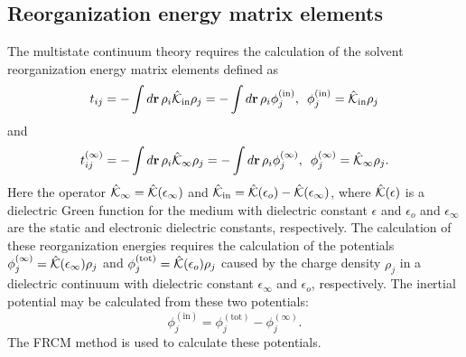 \documentclass[oneside,11pt,openany]{book}
\begin{document}
\subsection*{Reorganization energy matrix elements}
The multistate continuum theory requires the calculation
of the solvent
reorganization energy matrix elements defined as
\begin{equation}
t_{ij}=-\int d{\bf r}\, \rho_i \hat{\cal{K}}_{\mathrm{in}} \rho_j
= -\int d{\bf r}\, \rho_i \phi_j^{\mathrm{(in)}},\,\,\, \phi_j^{\mathrm{(in)}}=\hat{\cal{K}}_{\mathrm{in}} \rho_j
\end{equation}
and
\begin{equation}
t_{ij}^{(\infty)}=-\int d{\bf r}\, \rho_i \hat{\cal{K}}_{\infty} \rho_j
= -\int d{\bf r}\, \rho_i \phi_j^{(\infty)},\,\,\, \phi_j^{(\infty)}=\hat{\cal{K}}_{\infty} \rho_j.
\end{equation}
Here the operator $\hat{\cal{K}}_\infty=\hat{\cal{K}}(\epsilon_\infty)$
and $\hat{\cal{K}}_{\mathrm{in}}=\hat{\cal{K}}(\epsilon_o)-
\hat{\cal{K}}(\epsilon_\infty)$,
where $\hat{\cal{K}}(\epsilon)$ is a dielectric Green
function for the medium with dielectric constant $\epsilon$ and
$\epsilon_o$ and $\epsilon_\infty$ are the static and
electronic dielectric constants, respectively.
The calculation of these reorganization energies
requires the calculation of the potentials
$\phi_j^{(\infty)}=\hat{\cal{K}}(\epsilon_\infty) \rho_j$ and
$\phi_j^{\mathrm{(tot)}} = \hat{\cal{K}}(\epsilon_o) \rho_j$
caused by the charge density $\rho_j$ in a dielectric continuum
with dielectric constant $\epsilon_\infty$ and $\epsilon_o$, respectively.
The inertial potential may be calculated from these
two potentials: 
\begin{equation}
\phi_j^{\mathrm{(in)}}=\phi_j^{\mathrm{(tot)}}
- \phi_j^{\mathrm{(\infty)}}.
\label{eq.phiin}
\end{equation}
The FRCM method is used to calculate these potentials.
%
\end{document}
